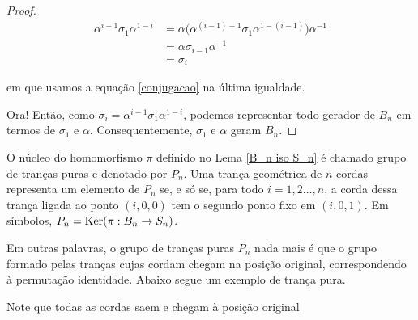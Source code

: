 \begin{proof}
		\begin{align*}
		\alpha^{i-1}\sigma_1\alpha^{1-i} &= \alpha\Big( \alpha^{(i-1)-1}\sigma_1\alpha^{1- (i-1)} \Big) \alpha^{-1} \\
		&= \alpha\sigma_{i-1}\alpha^{-1} \\
		&= \sigma_i
		\end{align*}
		
		\par\vspace{0.3cm} em que usamos a equação \eqref{conjugacao} na última igualdade. 
		
		\par\vspace{0.3cm} Ora! Então, como $\sigma_i = \alpha^{i-1}\sigma_1\alpha^{1-i}$, podemos representar todo gerador de $B_n$ em termos de $\sigma_1$ e $\alpha$. Consequentemente, $\sigma_1$ e $\alpha$ geram $B_n$.
		
	\end{proof}
	
	\begin{deff}
		\label{def P_n}
		O núcleo do homomorfismo $\pi$ definido no Lema \eqref{B_n iso S_n} é chamado grupo de tranças puras e denotado por $P_n$. Uma trança geométrica de $n$ cordas representa um elemento de $P_n$ se, e só se, para todo $i=1,2\dots,n$, a corda dessa trança ligada ao ponto $(i,0,0)$ tem o segundo ponto fixo em $(i,0,1)$. Em símbolos, $P_n = \operatorname{Ker}(\pi: B_n\to S_n )$.
	\end{deff}
	
	\par\vspace{0.3cm} Em outras palavras, o grupo de tranças puras $P_n$ nada mais é que o grupo formado pelas tranças cujas cordam chegam na posição original, correspondendo à permutação identidade. Abaixo segue um exemplo de trança pura.
	
	\begin{center}
	\end{center}
	\par\vspace{0.3cm} Note que todas as cordas saem e chegam à posição original
	
